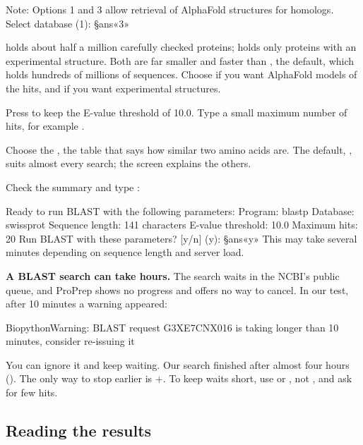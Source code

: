 \begin{steps}
\begin{screen}
Note: Options 1 and 3 allow retrieval of AlphaFold structures for homologs.
Select database (1): §ans«3»
\end{screen}
         holds about half a million carefully checked
        proteins;  holds only proteins with an experimental
        structure. Both are far smaller and faster than , the
        default, which holds hundreds of millions of sequences. Choose
         if you want AlphaFold models of the hits, and
         if you want experimental structures.
  \item Press  to keep the E-value threshold of 10.0. Type a
        small maximum number of hits, for example .
  \item Choose the , the table that says how similar two
        amino acids are. The default, ,
        suits almost every search; the screen explains the others.
  \item Check the summary and type :
\begin{screen}
Ready to run BLAST with the following parameters:
  Program: blastp
  Database: swissprot
  Sequence length: 141 characters
  E-value threshold: 10.0
  Maximum hits: 20
Run BLAST with these parameters? [y/n] (y): §ans«y»
This may take several minutes depending on sequence length and server load.
\end{screen}
\end{steps}

\begin{watchout}
\textbf{A BLAST search can take hours.} The search waits in the NCBI's public
queue, and ProPrep shows no progress and offers no way to cancel. In our test,
after 10 minutes a warning appeared:
\begin{screen}
BiopythonWarning: BLAST request G3XE7CNX016 is taking longer than 10 minutes,
consider re-issuing it
\end{screen}
You can ignore it and keep waiting. Our search finished after almost four hours
(). The only way to stop earlier is
+. To keep waits short, use  or
, not , and ask for few hits.
\end{watchout}

\subsection{Reading the results}

